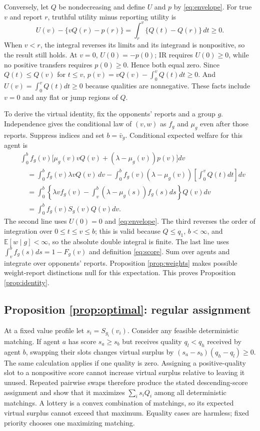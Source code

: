 \documentclass[11pt]{article}
\newcommand{\E}{\mathbb E}
\begin{document}
Conversely, let $Q$ be nondecreasing and define $U$ and $p$ by \eqref{eq:envelope}. For true $v$ and report $r$, truthful utility minus reporting utility is
\[
U(v)-\{vQ(r)-p(r)\}
=\int_r^v\{Q(t)-Q(r)\}\,dt\ge0.
\]
When $v<r$, the integral reverses its limits and its integrand is nonpositive, so the result still holds. At $v=0$, $U(0)=-p(0)$; IR requires $U(0)\ge0$, while no positive transfers requires $p(0)\ge0$. Hence both equal zero. Since $Q(t)\le Q(v)$ for $t\le v$, $p(v)=vQ(v)-\int_0^vQ(t)dt\ge0$. And $U(v)=\int_0^vQ(t)dt\ge0$ because qualities are nonnegative. These facts include $v=0$ and any flat or jump regions of $Q$.

To derive the virtual identity, fix the opponents' reports and a group $g$. Independence gives the conditional law of $(v,w)$ as $f_g$ and $\mu_g$ even after those reports. Suppress indices and set $b=\bar v_g$. Conditional expected welfare for this agent is
\begin{align*}
&\int_0^b f_g(v)\bigl[\mu_g(v)vQ(v)
+(\lambda-\mu_g(v))p(v)\bigr]dv\\
&\quad=\int_0^b f_g(v)\lambda vQ(v)\,dv
-\int_0^b f_g(v)(\lambda-\mu_g(v))
\left[\int_0^vQ(t)dt\right]dv\\
&\quad=\int_0^b\left\{\lambda vf_g(v)
-\int_v^b(\lambda-\mu_g(s))f_g(s)ds\right\}Q(v)dv\\
&\quad=\int_0^b f_g(v)S_g(v)Q(v)dv.
\end{align*}
The second line uses $U(0)=0$ and \eqref{eq:envelope}. The third reverses the order of integration over $0\le t\le v\le b$; this is valid because $Q\le q_1$, $b<\infty$, and $\E[w\mid g]<\infty$, so the absolute double integral is finite. The last line uses $\int_v^b f_g(s)ds=1-F_g(v)$ and definition \eqref{eq:score}. Sum over agents and integrate over opponents' reports. Proposition \ref{prop:weights} makes possible weight-report distinctions null for this expectation. This proves Proposition \ref{prop:identity}.

\subsection{Proposition \ref{prop:optimal}: regular assignment}

At a fixed value profile let $s_i=S_{g_i}(v_i)$. Consider any feasible deterministic matching. If agent $a$ has score $s_a\ge s_b$ but receives quality $q_l<q_h$ received by agent $b$, swapping their slots changes virtual surplus by $(s_a-s_b)(q_h-q_l)\ge0$. The same calculation applies if one quality is zero. Assigning a positive-quality slot to a nonpositive score cannot increase virtual surplus relative to leaving it unused. Repeated pairwise swaps therefore produce the stated descending-score assignment and show that it maximizes $\sum_i s_iQ_i$ among all deterministic matchings. A lottery is a convex combination of matchings, so its expected virtual surplus cannot exceed that maximum. Equality cases are harmless; fixed priority chooses one maximizing matching.
\end{document}
